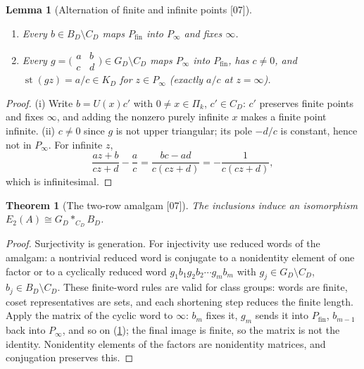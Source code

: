 \documentclass[11pt,oneside]{article}
\numberwithin{equation}{section}
\newtheorem{theorem}{Theorem}[section]
\newtheorem{lemma}[lemma]{Lemma}
\theoremstyle{definition}
\theoremstyle{remark}
\newcommand{\st}{\operatorname{st}}
\newcommand{\src}[1]{\textup{\textsf{\small[#1]}}}
\begin{document}
\begin{lemma}[Alternation of finite and infinite points \src{07}]\label{ogl:el:lem:pingpong}
\leavevmode
\begin{enumerate}
\item Every $b\in B_D\setminus C_D$ maps $P_{\mathrm{fin}}$ into $P_\infty$ and
fixes $\infty$.
\item Every $g=\bigl(\begin{smallmatrix}a&b\\c&d\end{smallmatrix}\bigr)\in
G_D\setminus C_D$ maps $P_\infty$ into $P_{\mathrm{fin}}$, has $c\ne0$, and
$\st(gz)=a/c\in K_D$ for $z\in P_\infty$ (exactly $a/c$ at $z=\infty$).
\end{enumerate}
\end{lemma}
\begin{proof}
(i) Write $b=U(x)c'$ with $0\ne x\in\Pi_k$, $c'\in C_D$: $c'$ preserves finite
points and fixes $\infty$, and adding the nonzero purely infinite $x$ makes a
finite point infinite. (ii) $c\ne0$ since $g$ is not upper triangular; its pole
$-d/c$ is constant, hence not in $P_\infty$. For infinite $z$,
\begin{equation}\label{ogl:el:eq:mobiusresidue}
 \frac{az+b}{cz+d}-\frac ac=\frac{bc-ad}{c(cz+d)}=-\frac1{c(cz+d)},
\end{equation}
which is infinitesimal.
\end{proof}

\begin{theorem}[The two-row amalgam \src{07}]\label{ogl:el:thm:amalgam}
The inclusions induce an isomorphism $E_2(A)\cong G_D*_{C_D}B_D$.
\end{theorem}
\begin{proof}
Surjectivity is generation. For injectivity use reduced words of the amalgam:
a nontrivial reduced word is conjugate to a nonidentity element of one factor or
to a cyclically reduced word
$g_1b_1g_2b_2\cdots g_mb_m$ with $g_j\in G_D\setminus C_D$,
$b_j\in B_D\setminus C_D$. These finite-word rules are valid for class groups:
words are finite, coset representatives are sets, and each shortening step
reduces the finite length. Apply the matrix of the cyclic word to $\infty$:
$b_m$ fixes it, $g_m$ sends it into $P_{\mathrm{fin}}$, $b_{m-1}$ back into
$P_\infty$, and so on (\cref{ogl:el:lem:pingpong}); the final image is finite,
so the matrix is not the identity. Nonidentity elements of the factors are
nonidentity matrices, and conjugation preserves this.
\end{proof}
\end{document}
